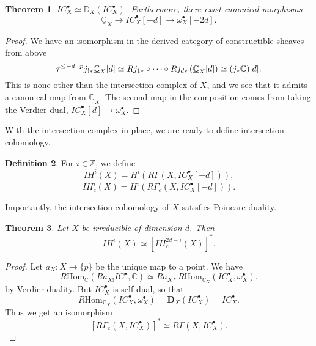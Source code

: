 \documentclass[12pt]{amsart}
\newcommand{\C}{\mathbb{C}}
\newcommand{\Z}{\mathbb{Z}}
\newcommand{\Hom}{\text{Hom}}
\newtheorem{theorem}{Theorem}[section]
\theoremstyle{definition}
\newtheorem{definition}[theorem]{Definition}
\theoremstyle{remark}
\numberwithin{equation}{section}
\begin{document}
\begin{theorem}\label{canonical-morphisms}
    \(IC_X^{\bullet} \simeq \mathbb{D}_X (IC_X^{\bullet}) \). Furthermore, there exist canonical morphisms
    \begin{equation}
        \underline{\C}_X \to IC_X^{\bullet}[-d] \to \omega_X^\bullet[-2d].
    \end{equation}
\end{theorem}
\begin{proof}
We have an isomorphism in the derived category of constructible sheaves
from above
\begin{equation}
    \tau^{\leq -d}\ \prescript{p}{}{j}_{!*} \underline{\C}_X[d] \simeq
     Rj_{1*} \circ \cdots \circ Rj_{d*}
     \left(\underline{\C}_X[d]\right) \simeq (j_* \C)[d].
\end{equation}
This is none other than the intersection complex of $X$, and we see that it admits a canonical map from $\underline{\C}_X$. The second map in the composition comes from taking the Verdier dual,
\(IC_X^\bullet[d] \to \omega_X^\bullet \).
\end{proof}

With the intersection complex in place, we are ready to define intersection cohomology.
\begin{definition}
    For $i \in \Z$, we define
    \begin{equation}
        IH^i(X) = H^i\left(R\Gamma\left(X, IC_X^\bullet[-d]\right)\right),
    \end{equation}
    \begin{equation}
        IH_c^i(X) = H^i\left(R\Gamma_c\left(X, IC_X^\bullet[-d]\right)\right).
    \end{equation}
\end{definition}

Importantly, the intersection cohomology of $X$ satisfies Poincare duality.
\begin{theorem}
    Let $X$ be irreducible of dimension $d$. Then
    \begin{equation}
        IH^i(X) \simeq \left[IH_c^{2d-i}(X)\right]^*.
    \end{equation}
\end{theorem}
\begin{proof}
Let $a_X: X \to \{p\}$ be the unique map to a point. We have 
\begin{equation}
    R\Hom_\C(Ra_{X!} IC^\bullet, \C) \simeq 
    Ra_{X*} R\Hom_{\C_X}(IC_X^\bullet, \omega_X^\bullet).
\end{equation}
by Verdier duality. But \(IC_X^\bullet\) is self-dual, so that
\begin{equation*}
    R\Hom_{\C_X}(IC_X^\bullet, \omega_X^\bullet) = 
    \mathbf{D}_X(IC_X^\bullet) = IC_X^\bullet.
\end{equation*}
Thus we get an isomorphism
\begin{equation}
    \left[R \Gamma_c(X, IC_X^\bullet)\right]^* \simeq 
    R\Gamma(X, IC_X^\bullet).
\end{equation}


\end{proof}
\end{document}
